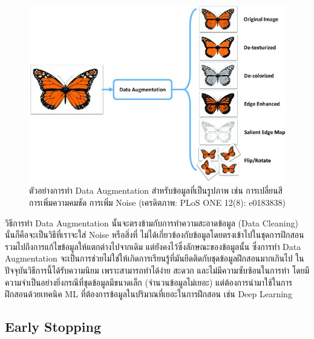 \begin{figure}[H]
    \centering
    \includegraphics[width=0.9\linewidth]{fig/data_aug_butterfly.jpg}
    \caption{ตัวอย่างการทำ Data Augmentation สำหรับข้อมูลที่เป็นรูปภาพ เช่น การเปลี่ยนสี การเพิ่มความคมชัด การเพิ่ม Noise 
    (เครดิตภาพ: PLoS ONE 12(8): e0183838)}
    \label{fig:data_aug_butterfly}
\end{figure}

วิธีการทำ Data Augmentation นั้นจะตรงข้ามกับการทำความสะอาดข้อมูล (Data Cleaning) นั่นก็คือจะเป็นวิธีที่เราจะใส่ Noise หรือสิ่งที่%
ไม่ได้เกี่ยวข้องกับข้อมูลโดยตรงเข้าไปในชุดการฝึกสอน รวมไปถึงการแก้ไขข้อมูลให้แตกต่างไปจากเดิม แต่ยังคงไว้ซึ่งลักษณะของข้อมูลนั้น 
ซึ่งการทำ Data Augmentation จะเป็นการช่วยไม่ใช่ให้เกิดการเรียนรู้ที่มันยึดติดกับชุดข้อมูลฝึกสอนมากเกินไป ในปัจจุบันวิธีการนี้ได้รับความนิยม%
เพราะสามารถทำได้ง่าย สะดวก และไม่มีความซับซ้อนในการทำ โดยมีความจำเป็นอย่างยิ่งกรณีที่ชุดข้อมูลมีขนาดเล็ก (จำนวนข้อมูลไม่เยอะ) 
แต่ต้องการนำมาใช้ในการฝึกสอนด้วยเทคนิค ML ที่ต้องการข้อมูลในปริมาณที่เยอะในการฝึกสอน เช่น Deep Learning\autocite{bengio2021}

\subsection{Early Stopping}
\label{ssec:early_stop}

